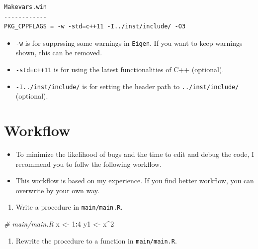 \documentclass[]{book}
\newenvironment{Shaded}{\begin{snugshade}}{\end{snugshade}}
\newcommand{\DecValTok}[1]{\textcolor[rgb]{0.00,0.00,0.81}{#1}}
\newcommand{\StringTok}[1]{\textcolor[rgb]{0.31,0.60,0.02}{#1}}
\newcommand{\CommentTok}[1]{\textcolor[rgb]{0.56,0.35,0.01}{\textit{#1}}}
\newcommand{\OperatorTok}[1]{\textcolor[rgb]{0.81,0.36,0.00}{\textbf{#1}}}
\newcommand{\NormalTok}[1]{#1}
\providecommand{\tightlist}{%
  \setlength{\itemsep}{0pt}\setlength{\parskip}{0pt}}
\begin{document}
\begin{itemize}
\begin{verbatim}
Makevars.win
------------
PKG_CPPFLAGS = -w -std=c++11 -I../inst/include/ -O3
\end{verbatim}

  \begin{itemize}
  \tightlist
  \item
    \texttt{-w} is for supprssing some warnings in \texttt{Eigen}. If
    you want to keep warnings shown, this can be removed.
  \item
    \texttt{-std=c++11} is for using the latest functionalities of C++
    (optional).
  \item
    \texttt{-I../inst/include/} is for setting the header path to
    \texttt{../inst/include/} (optional).
  \end{itemize}
\end{itemize}

\section{Workflow}\label{workflow}

\begin{itemize}
\tightlist
\item
  To minimize the likelihood of bugs and the time to edit and debug the
  code, I recommend you to follw the following workflow.
\item
  This workflow is based on my experience. If you find better workflow,
  you can overwrite by your own way.
\end{itemize}

\begin{enumerate}
\def\labelenumi{\arabic{enumi}.}
\tightlist
\item
  Write a procedure in \texttt{main/main.R}.
\end{enumerate}

\begin{Shaded}
\begin{Highlighting}[]
\CommentTok{# main/main.R}
\NormalTok{x <-}\StringTok{ }\DecValTok{1}\OperatorTok{:}\DecValTok{4}
\NormalTok{y1 <-}\StringTok{ }\NormalTok{x}\OperatorTok{^}\DecValTok{2}
\end{Highlighting}
\end{Shaded}

\begin{enumerate}
\def\labelenumi{\arabic{enumi}.}
\setcounter{enumi}{1}
\tightlist
\item
  Rewrite the procedure to a function in \texttt{main/main.R}.
\end{enumerate}
\end{document}
